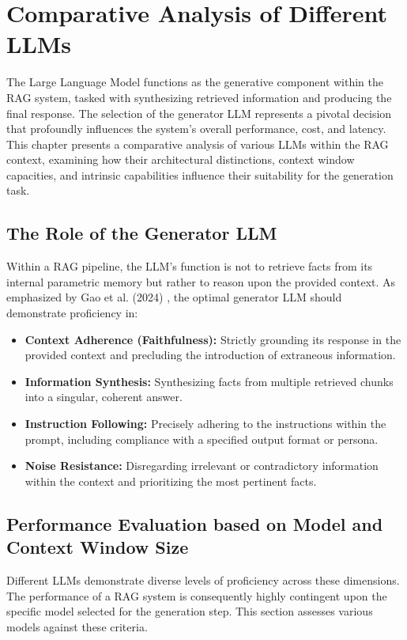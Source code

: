 \chapter{Comparative Analysis of Different LLMs}
\label{chap:llm_comparison}

The Large Language Model functions as the generative component within the RAG system, tasked with synthesizing retrieved information and producing the final response. The selection of the generator LLM represents a pivotal decision that profoundly influences the system's overall performance, cost, and latency. This chapter presents a comparative analysis of various LLMs within the RAG context, examining how their architectural distinctions, context window capacities, and intrinsic capabilities influence their suitability for the generation task.

\section{The Role of the Generator LLM}
Within a RAG pipeline, the LLM's function is not to retrieve facts from its internal parametric memory but rather to reason upon the provided context. As emphasized by Gao et al. (2024) \autocite{gao2024retrievalaugmented}, the optimal generator LLM should demonstrate proficiency in:
\begin{itemize}
    \item \textbf{Context Adherence (Faithfulness):} Strictly grounding its response in the provided context and precluding the introduction of extraneous information.
    \item \textbf{Information Synthesis:} Synthesizing facts from multiple retrieved chunks into a singular, coherent answer.
    \item \textbf{Instruction Following:} Precisely adhering to the instructions within the prompt, including compliance with a specified output format or persona.
    \item \textbf{Noise Resistance:} Disregarding irrelevant or contradictory information within the context and prioritizing the most pertinent facts.
\end{itemize}

\section{Performance Evaluation based on Model and Context Window Size}
Different LLMs demonstrate diverse levels of proficiency across these dimensions. The performance of a RAG system is consequently highly contingent upon the specific model selected for the generation step. This section assesses various models against these criteria.

